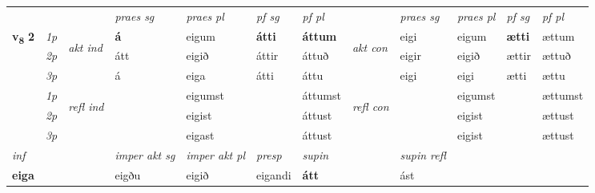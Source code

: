 \begin{longtable}[l]{X>{\footnotesize\itshape}llXXXXlXXXX}
 & &   & \textit{praes sg}  & \textit{praes pl}    & \textit{ pf sg} & \textit{pf pl} & & \textit{praes sg}  & \textit{praes pl}    & \textit{pf sg} & \textit{pf pl }  \\ \cmidrule{4-7} \cmidrule{9-12}
 \multirow{2}{*}{{{\textbf{v{\textsubscript{8}}} \Large{\textbf{2}}}}}  & 1p & \multirow{3}{*}{\begin{turn}{90}\textit{akt ind}\end{turn}} & \textbf{á} & eigum & \textbf{átti} & \textbf{áttum} & \multirow{3}{*}{\begin{turn}{90}\textit{akt con}\end{turn}} &eigi & eigum & \textbf{ætti} & ættum\\*
 & 2p &  &  átt  & eigið & áttir & áttuð & & eigir & eigið & ættir & ættuð \\*
 & 3p &  & á & eiga & átti & áttu & & eigi & eigi& ætti & ættu \\*
\cmidrule{4-7} \cmidrule{9-12}
 & 1p & \multirow{3}{*}{\begin{turn}{90}\textit{refl ind}\end{turn}}  &  & eigumst &  & áttumst & \multirow{3}{*}{\begin{turn}{90}\textit{refl con}\end{turn}}  & & eigumst &  & ættumst \\*
 & 2p &  &  & eigist &  & áttust & & & eigist &  & ættust \\*
 & 3p  & &  & eigast &  & áttust & &  & eigist&  & ættust \\*
\cmidrule{4-7} \cmidrule{9-12}

   {\textit{inf}} & &  & \textit{imper akt sg} & \textit{imper akt pl}   & \textit{presp} & \textit{supin} && \textit{supin refl}  \\*
  {\textbf{eiga}} & && eigðu  & eigið   & eigandi &  \textbf{átt} && ást  \\*

\midrule


\end{longtable}
